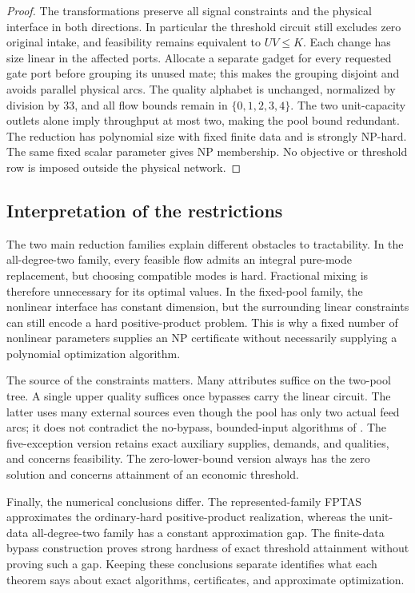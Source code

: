\begin{proof}
The transformations preserve all signal constraints and the physical
interface in both directions. In particular the threshold circuit still
excludes zero original intake, and feasibility remains equivalent to
$UV\le K$. Each change has size linear in the affected ports. Allocate a separate
gadget for every requested gate port before grouping its unused mate;
this makes the grouping disjoint and avoids parallel physical arcs. The
quality alphabet is unchanged, normalized by division by 33, and all
flow bounds remain in $\{0,1,2,3,4\}$. The two unit-capacity outlets
alone imply throughput at most two, making the pool bound redundant.
The reduction has polynomial size with fixed finite data and is strongly
NP-hard. The same fixed scalar parameter gives NP membership. No
objective or threshold row is imposed outside the physical network.
\end{proof}

\subsection{Interpretation of the restrictions}\label{s3:scope}

The two main reduction families explain different obstacles to
tractability. In the all-degree-two family, every feasible flow admits
an integral pure-mode replacement, but choosing compatible modes is
hard. Fractional mixing is therefore unnecessary for its optimal values.
In the fixed-pool family, the nonlinear interface has constant dimension,
but the surrounding linear constraints can still encode a hard
positive-product problem. This is why a fixed number of nonlinear
parameters supplies an NP certificate without necessarily supplying a
polynomial optimization algorithm.

The source of the constraints matters. Many attributes suffice on the
two-pool tree. A single upper quality suffices once bypasses carry the
linear circuit. The latter uses many external sources even though the
pool has only two actual feed arcs; it does not contradict the
no-bypass, bounded-input algorithms of
\citet{s4:boland2017,s3:haugland-hendrix2016}. The five-exception version
retains exact auxiliary supplies, demands, and qualities, and concerns
feasibility. The zero-lower-bound version always has the zero solution
and concerns attainment of an economic threshold.

Finally, the numerical conclusions differ. The represented-family FPTAS
approximates the ordinary-hard positive-product realization, whereas the
unit-data all-degree-two family has a constant approximation gap. The
finite-data bypass construction proves strong hardness of exact
threshold attainment without proving such a gap. Keeping these
conclusions separate identifies what each theorem says about exact
algorithms, certificates, and approximate optimization.
